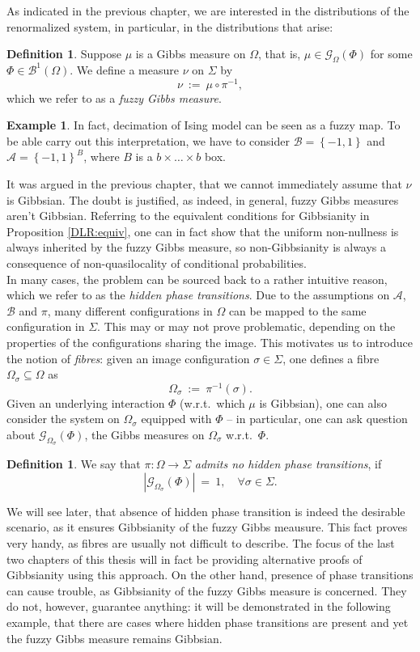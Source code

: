 \documentclass[12pt]{article}
\newcommand{\A}{\mathcal{A}}
\newcommand{\B}{\mathcal{B}}
\newcommand{\BB}{\mathscr{B}}
\newcommand{\G}{\mathcal{G}}
\newcommand{\set}[1]{\left\{#1\right\}}
\newcommand{\ra}{\rightarrow}
\newcommand{\1}{\mathbbm{1}}
\newcommand{\5}{\vspace{0.5cm}}
\theoremstyle{definition}
\newtheorem{ex}[thm]{Example}
\newtheorem{df}[thm]{Definition}
\begin{document}
As indicated in the previous chapter, we are interested in the distributions of the renormalized system, in particular, in the distributions that arise:
\begin{df}
Suppose $\mu$ is a Gibbs measure on $\Omega$, that is, $\mu\in\G_\Omega(\Phi)$ for some $\Phi\in\BB^1(\Omega)$. We define a measure $\nu$ on $\Sigma$ by
$$\nu ~:=~ \mu \circ \pi^{-1},$$
which we refer to as a \textit{fuzzy Gibbs measure}.
\end{df}
\begin{ex}
In fact, decimation of Ising model can be seen as a fuzzy map. To be able carry out this interpretation, we have to consider $\B=\set{-1,1}$ and $\A=\set{-1,1}^{B}$, where $B$ is a $b\times \ldots\times b$ box.
\end{ex}
It was argued in the previous chapter, that we cannot immediately assume that $\nu$ is Gibbsian. The doubt is justified, as indeed, in general, fuzzy Gibbs measures aren't Gibbsian. Referring to the equivalent conditions for Gibbsianity in Proposition \ref{DLR:equiv}, one can in fact show that the uniform non-nullness is always inherited by the fuzzy Gibbs measure, so non-Gibbsianity is always a consequence of non-quasilocality of conditional probabilities. \\

In many cases, the problem can be sourced back to a rather intuitive reason, which we refer to as the \textit{hidden phase transitions}. Due to the assumptions on $\A$, $\B$ and $\pi$, many different configurations in $\Omega$ can be mapped to the same configuration in $\Sigma$. This may or may not prove problematic, depending on the properties of the configurations sharing the image. This motivates us to introduce the notion of \textit{fibres}: given an image configuration $\sigma\in\Sigma$, one defines a fibre $\Omega_\sigma\subseteq\Omega$ as
$$\Omega_\sigma ~:=~ \pi^{-1}(\sigma).$$
Given an underlying interaction $\Phi$ (w.r.t.~which $\mu$ is Gibbsian), one can also consider the system on $\Omega_\sigma$ equipped with $\Phi$ -- in particular, one can ask question about $\G_{\Omega_\sigma}(\Phi)$, the Gibbs measures on $\Omega_\sigma$ w.r.t.~$\Phi$. 
\begin{df}
We say that $\pi:\Omega\ra\Sigma$ \textit{admits no hidden phase transitions}, if 
$$|\G_{\Omega_\sigma}(\Phi)| ~=~ 1, \quad \forall \sigma\in\Sigma.$$
\end{df}
We will see later, that absence of hidden phase transition is indeed the desirable scenario, as it ensures Gibbsianity of the fuzzy Gibbs meausure. This fact proves very handy, as fibres are usually not difficult to describe. The focus of the last two chapters of this thesis will in fact be providing alternative proofs of Gibbsianity using this approach. On the other hand, presence of phase transitions can cause trouble, as Gibbsianity of the fuzzy Gibbs measure is concerned. They do not, however, guarantee anything: it will be demonstrated in the following example, that there are cases where hidden phase transitions are present and yet the fuzzy Gibbs measure remains Gibbsian.
\end{document}
